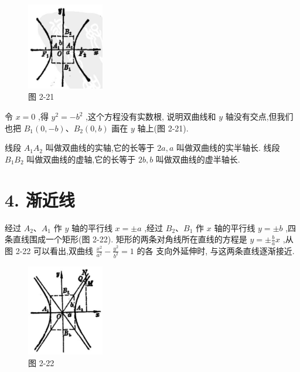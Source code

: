 \documentclass[lang=cn,newtx,10pt,scheme=chinese]{elegantbook}
\begin{document}
\begin{figure}[h]
  \centering
  \includegraphics[max width=0.3\textwidth]{images/01912cc2-ffb6-728e-9ae7-b113ff05c64b_99_697647.jpg}
  \caption{图 2-21}
\end{figure}



令 \(x = 0\) ,得 \({y}^{2} = - {b}^{2}\) ,这个方程没有实数根, 说明双曲线和 \(y\) 轴没有交点,但我们也把 \({B}_{1}\left( {0, - b}\right) \text{、}{B}_{2}\left( {0,b}\right)\) 画在 \(y\) 轴上(图 2-21).

线段 \({A}_{1}{A}_{2}\) 叫做双曲线的实轴,它的长等于 \({2a},a\) 叫做双曲线的实半轴长. 线段 \({B}_{1}{B}_{2}\) 叫做双曲线的虚轴,它的长等于 \({2b},b\) 叫做双曲线的虚半轴长.

\section*{4. 渐近线}

经过 \({A}_{2}\text{、}{A}_{1}\) 作 \(y\) 轴的平行线 \(x = \pm a\) ,经过 \({B}_{2}\text{、}{B}_{1}\) 作 \(x\) 轴的平行线 \(y = \pm b\) ,四条直线围成一个矩形(图 2-22). 矩形的两条对角线所在直线的方程是 \(y = \pm \frac{b}{a}x\) ,从图 2-22 可以看出,双曲线 \(\frac{{x}^{2}}{{a}^{2}} - \frac{{y}^{2}}{{b}^{2}} = 1\) 的各 支向外延伸时, 与这两条直线逐渐接近.

\begin{figure}[h]
  \centering
  \includegraphics[max width=0.3\textwidth]{images/01912cc2-ffb6-728e-9ae7-b113ff05c64b_100_513224.jpg}
  \caption{图 2-22}
\end{figure}
\end{document}
